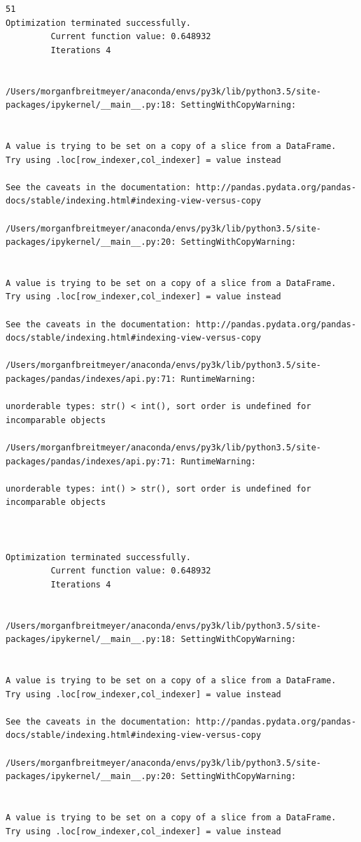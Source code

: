 \begin{lstlisting}
51
Optimization terminated successfully.
         Current function value: 0.648932
         Iterations 4


/Users/morganfbreitmeyer/anaconda/envs/py3k/lib/python3.5/site-packages/ipykernel/__main__.py:18: SettingWithCopyWarning:


A value is trying to be set on a copy of a slice from a DataFrame.
Try using .loc[row_indexer,col_indexer] = value instead

See the caveats in the documentation: http://pandas.pydata.org/pandas-docs/stable/indexing.html#indexing-view-versus-copy

/Users/morganfbreitmeyer/anaconda/envs/py3k/lib/python3.5/site-packages/ipykernel/__main__.py:20: SettingWithCopyWarning:


A value is trying to be set on a copy of a slice from a DataFrame.
Try using .loc[row_indexer,col_indexer] = value instead

See the caveats in the documentation: http://pandas.pydata.org/pandas-docs/stable/indexing.html#indexing-view-versus-copy

/Users/morganfbreitmeyer/anaconda/envs/py3k/lib/python3.5/site-packages/pandas/indexes/api.py:71: RuntimeWarning:

unorderable types: str() < int(), sort order is undefined for incomparable objects

/Users/morganfbreitmeyer/anaconda/envs/py3k/lib/python3.5/site-packages/pandas/indexes/api.py:71: RuntimeWarning:

unorderable types: int() > str(), sort order is undefined for incomparable objects



Optimization terminated successfully.
         Current function value: 0.648932
         Iterations 4


/Users/morganfbreitmeyer/anaconda/envs/py3k/lib/python3.5/site-packages/ipykernel/__main__.py:18: SettingWithCopyWarning:


A value is trying to be set on a copy of a slice from a DataFrame.
Try using .loc[row_indexer,col_indexer] = value instead

See the caveats in the documentation: http://pandas.pydata.org/pandas-docs/stable/indexing.html#indexing-view-versus-copy

/Users/morganfbreitmeyer/anaconda/envs/py3k/lib/python3.5/site-packages/ipykernel/__main__.py:20: SettingWithCopyWarning:


A value is trying to be set on a copy of a slice from a DataFrame.
Try using .loc[row_indexer,col_indexer] = value instead


\end{lstlisting}
